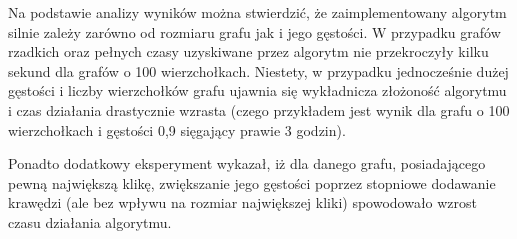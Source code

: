 \documentclass[12pt, a4paper]{article}
\begin{document}
Na podstawie analizy wyników można stwierdzić, że zaimplementowany algorytm silnie zależy zarówno od rozmiaru grafu jak i jego gęstości. W przypadku grafów rzadkich oraz pełnych czasy uzyskiwane przez
 algorytm nie przekroczyły kilku sekund dla grafów o 100 wierzchołkach. 
Niestety, w przypadku jednocześnie dużej gęstości i liczby wierzchołków grafu ujawnia się wykładnicza złożoność 
algorytmu i czas działania drastycznie wzrasta (czego przykładem jest wynik dla grafu o 100 wierzchołkach
i gęstości 0,9 sięgający prawie 3 godzin).

Ponadto dodatkowy eksperyment wykazał, iż dla danego grafu, posiadającego pewną największą klikę, zwiększanie jego gęstości poprzez stopniowe dodawanie krawędzi (ale bez wpływu na rozmiar największej kliki) spowodowało wzrost czasu działania algorytmu.
\end{document}

